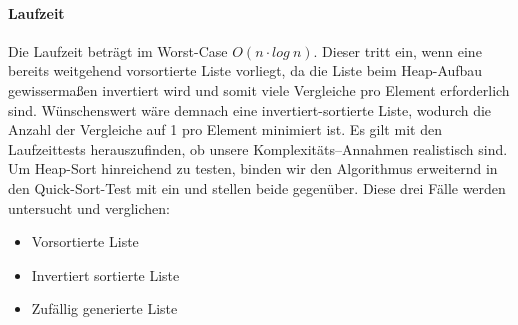 \paragraph{Laufzeit}\label{subsec:Hlaufzeit}
Die Laufzeit beträgt im Worst-Case \(O(n\cdot log\ n)\). Dieser tritt
ein, wenn eine bereits weitgehend vorsortierte Liste vorliegt, da die
Liste beim Heap-Aufbau gewissermaßen invertiert wird und somit viele
Vergleiche pro Element erforderlich sind.
Wünschenswert wäre demnach eine invertiert-sortierte Liste, wodurch die
Anzahl der Vergleiche auf 1 pro Element minimiert ist.
Es gilt mit den Laufzeittests herauszufinden, ob unsere
Komplexitäts--Annahmen realistisch sind.
Um Heap-Sort hinreichend zu testen, binden wir den Algorithmus erweiternd
in den Quick-Sort-Test mit ein und stellen beide gegenüber.
Diese drei Fälle werden untersucht und verglichen:
\begin{samepage}
    \begin{itemize}
        \item Vorsortierte Liste
        \item Invertiert sortierte Liste
        \item Zufällig generierte Liste
    \end{itemize}
\end{samepage}